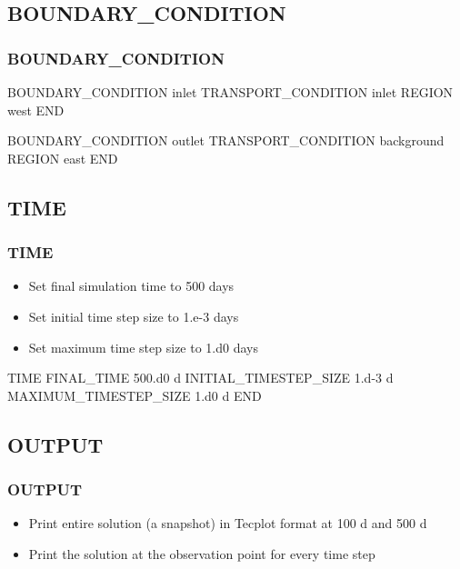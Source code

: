 \documentclass{beamer}
\begin{document}
\subsection{BOUNDARY\_CONDITION}

\begin{frame}\frametitle{BOUNDARY\_CONDITION}

\small
\begin{semiverbatim}
BOUNDARY_CONDITION inlet
  TRANSPORT_CONDITION inlet
  REGION west
END

BOUNDARY_CONDITION outlet
  TRANSPORT_CONDITION background
  REGION east
END

\end{semiverbatim}

\end{frame}

\subsection{TIME}

\begin{frame}[fragile]\frametitle{TIME}

\begin{itemize}
\item Set final simulation time to 500 days
\item Set initial time step size to 1.e-3 days
\item Set maximum time step size to 1.d0 days
\end{itemize}


\begin{semiverbatim}

TIME
  FINAL_TIME 500.d0 d
  INITIAL_TIMESTEP_SIZE 1.d-3 d
  MAXIMUM_TIMESTEP_SIZE 1.d0 d
END
\end{semiverbatim}

\end{frame}

\subsection{OUTPUT}

\begin{frame}[fragile]\frametitle{OUTPUT}

\begin{itemize}
\item Print entire solution (a snapshot) in Tecplot format at 100 d and 500 d
\item Print the solution at the observation point for every time step
\end{itemize}

\end{frame}
\end{document}
